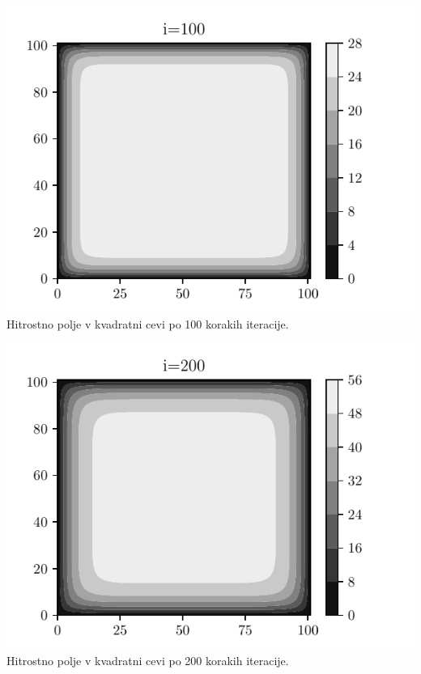 \begin{center}
    \begin{minipage}{0.45\textwidth}
        \centering
    \includegraphics[width=\textwidth]{../old/../old/0-kvadratna_i100.pdf}
    {Hitrostno polje v kvadratni cevi po 100 korakih iteracije.}
    \end{minipage}\hfill
    \begin{minipage}{0.45\textwidth}
        \centering
        \includegraphics[width=1\textwidth]{../old/0-kvadratna_i200.pdf}
    {Hitrostno polje v kvadratni cevi po 200 korakih iteracije.}
    \end{minipage}



\end{center}
